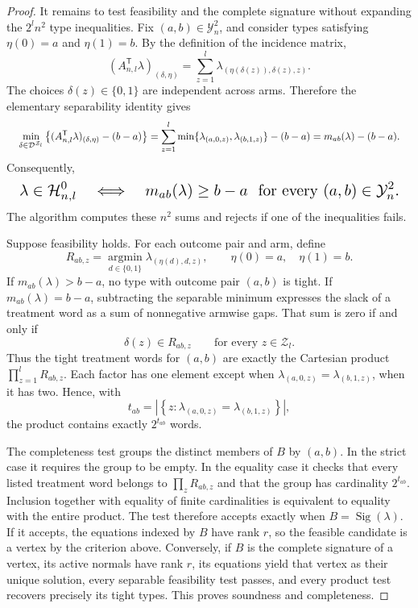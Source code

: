 \documentclass{article}
\begin{document}
\begin{proof}
It remains to test feasibility and the complete signature without expanding the \(2^l n^2\) type inequalities. Fix \((a,b)\in\mathcal Y_n^2\), and consider types satisfying \(\eta(0)=a\) and \(\eta(1)=b\). By the definition of the incidence matrix,
\[
(A_{n,l}^{\mathsf T}\lambda)_{(\delta,\eta)}
=\sum_{z=1}^l\lambda_{(\eta(\delta(z)),\delta(z),z)}.
\]
The choices \(\delta(z)\in\{0,1\}\) are independent across arms. Therefore the elementary separability identity gives
\[
\makebox[\linewidth][c]{\resizebox{0.98\linewidth}{!}{\(\displaystyle \min_{\delta\in\mathcal D^{\mathcal Z_l}}
\left\{(A_{n,l}^{\mathsf T}\lambda)_{(\delta,\eta)}-(b-a)\right\}
=\sum_{z=1}^l\min\{\lambda_{(a,0,z)},\lambda_{(b,1,z)}\}-(b-a)
=m_{ab}(\lambda)-(b-a).\)}}
\]
Consequently,
\[
\makebox[\linewidth][c]{\resizebox{0.98\linewidth}{!}{\(\displaystyle \lambda\in\mathcal H^0_{n,l}
\quad\Longleftrightarrow\quad
m_{ab}(\lambda)\ge b-a\ \text{ for every }(a,b)\in\mathcal Y_n^2.\)}}
\]
The algorithm computes these \(n^2\) sums and rejects if one of the inequalities fails.

Suppose feasibility holds. For each outcome pair and arm, define
\[
R_{ab,z}=\operatorname*{argmin}_{d\in\{0,1\}}
\lambda_{(\eta(d),d,z)},
\qquad \eta(0)=a,\quad \eta(1)=b.
\]
If \(m_{ab}(\lambda)>b-a\), no type with outcome pair \((a,b)\) is tight. If \(m_{ab}(\lambda)=b-a\), subtracting the separable minimum expresses the slack of a treatment word as a sum of nonnegative armwise gaps. That sum is zero if and only if
\[
\delta(z)\in R_{ab,z}\qquad\text{for every }z\in\mathcal Z_l.
\]
Thus the tight treatment words for \((a,b)\) are exactly the Cartesian product \(\prod_{z=1}^lR_{ab,z}\). Each factor has one element except when \(\lambda_{(a,0,z)}=\lambda_{(b,1,z)}\), when it has two. Hence, with
\[
t_{ab}=\left|\left\{z:\lambda_{(a,0,z)}=\lambda_{(b,1,z)}\right\}\right|,
\]
the product contains exactly \(2^{t_{ab}}\) words.

The completeness test groups the distinct members of \(B\) by \((a,b)\). In the strict case it requires the group to be empty. In the equality case it checks that every listed treatment word belongs to \(\prod_zR_{ab,z}\) and that the group has cardinality \(2^{t_{ab}}\). Inclusion together with equality of finite cardinalities is equivalent to equality with the entire product. The test therefore accepts exactly when \(B=\operatorname{Sig}(\lambda)\). If it accepts, the equations indexed by \(B\) have rank \(r\), so the feasible candidate is a vertex by the criterion above. Conversely, if \(B\) is the complete signature of a vertex, its active normals have rank \(r\), its equations yield that vertex as their unique solution, every separable feasibility test passes, and every product test recovers precisely its tight types. This proves soundness and completeness.


\end{proof}
\end{document}
